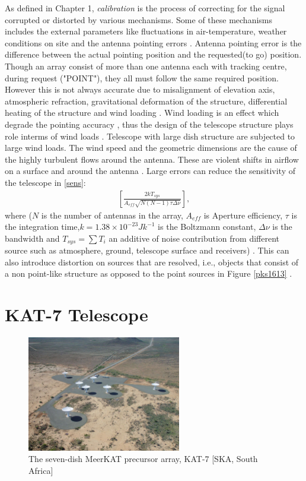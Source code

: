 As defined in Chapter 1, \textit{calibration} is the process of correcting for the signal corrupted or distorted by various mechanisms. Some of these mechanisms includes the external parameters like fluctuations in air-temperature, weather conditions on site and the antenna pointing errors \citep{taylor1999synthesis}. Antenna pointing error is the difference between the actual pointing position and the requested(to go) position. Though an array consist of more than one antenna each with tracking centre, during request ("POINT"),  they all must follow the same required position. However this is not always accurate due to misalignment of elevation axis, atmospheric refraction, gravitational deformation of the structure, differential heating of the structure and wind loading \citep{taylor1999synthesis}. Wind loading is an effect which degrade the pointing accuracy , thus the design of the telescope structure plays  role interms of wind loads \citep{smithdynamic}. Telescope with large dish structure are subjected to large wind loads. The wind speed and the geometric dimensions are the cause of the highly turbulent flows around the antenna. These are violent shifts in airflow on a surface and around the antenna \citep{upnere2012characterization}. Large errors can reduce the sensitivity of the telescope in \ref{sens}:
\begin{align}
\left[\frac{2kT_{sys}}{A_{eff}\sqrt{N(N-1)\tau \Delta \nu}}\right]
\label{sens},
\end{align}
 where ($N$ is the number of antennas in the array,  $A_{eff}$ is Aperture efficiency, $\tau$ is the integration time,$k=1.38\times 10^{-23}Jk^{-1}$ is the Boltzmann constant, $\Delta \nu$ is the bandwidth and $T_{sys}=\sum T_{i}$ an additive of noise contribution from different source such as atmosphere, ground, telescope surface and receivers) \citep{wilson2013tools}. This can also introduce distortion on sources that are resolved, i.e., objects that consist of a non point-like structure as opposed to the point sources in Figure \ref{pks1613} \citep{Calibration}. 



\section{KAT-7 Telescope}
\label{kat7}

\begin{figure}[H]
  \centering
    \includegraphics[width=0.6\textwidth]{images/K7.png}
    \caption{The seven-dish MeerKAT precursor array, KAT-7 [SKA, South Africa]}
  \label{images/kat7.png}
\end{figure}

